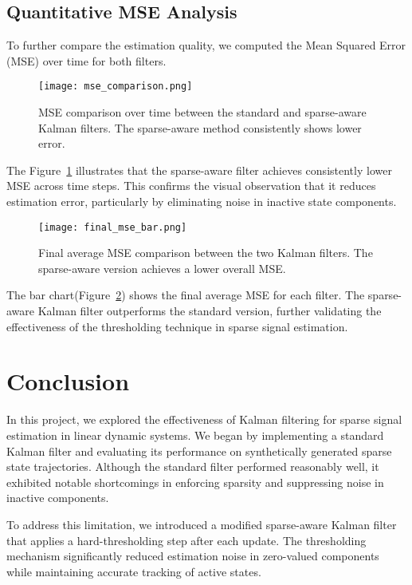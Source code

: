 \documentclass[12pt]{article}
\begin{document}
\subsection{Quantitative MSE Analysis}
To further compare the estimation quality, we computed the Mean Squared Error (MSE) over time for both filters.

\begin{figure}[h!]
  \centering
  \texttt{[image: mse\_comparison.png]}
  \caption{MSE comparison over time between the standard and sparse-aware Kalman filters. The sparse-aware method consistently shows lower error.}
  \label{fig:mse-over-time}
\end{figure}

The Figure~\ref{fig:mse-over-time}  illustrates that the sparse-aware filter achieves consistently lower MSE across time steps. This confirms the visual observation that it reduces estimation error, particularly by eliminating noise in inactive state components.

\begin{figure}[h!]
  \centering
  \texttt{[image: final\_mse\_bar.png]}
  \caption{Final average MSE comparison between the two Kalman filters. The sparse-aware version achieves a lower overall MSE.}
  \label{fig:mse-final-bar}
\end{figure}

The bar chart(Figure~\ref{fig:mse-final-bar}) shows the final average MSE for each filter. The sparse-aware Kalman filter outperforms the standard version, further validating the effectiveness of the thresholding technique in sparse signal estimation.
\newpage
\section{Conclusion}

In this project, we explored the effectiveness of Kalman filtering for sparse signal estimation in linear dynamic systems. We began by implementing a standard Kalman filter and evaluating its performance on synthetically generated sparse state trajectories. Although the standard filter performed reasonably well, it exhibited notable shortcomings in enforcing sparsity and suppressing noise in inactive components.

To address this limitation, we introduced a modified sparse-aware Kalman filter that applies a hard-thresholding step after each update. The thresholding mechanism significantly reduced estimation noise in zero-valued components while maintaining accurate tracking of active states.
\end{document}
